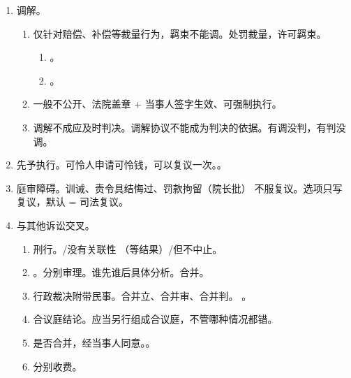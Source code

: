 \begin{enumerate}
\begin{enumerate}
        \end{enumerate}
  \item 调解。
        \begin{enumerate}
          \item 仅针对赔偿、补偿等裁量行为，羁束不能调。处罚裁量，许可羁束。
                \begin{enumerate}
                  \item {}。
                  \item {}。
                \end{enumerate}
          \item 一般不公开、法院盖章 + 当事人签字生效、可强制执行。
          \item 调解不成应及时判决。调解协议不能成为判决的依据。有调没判，有判没调。
        \end{enumerate}
  \item 先予执行。可怜人申请可怜钱，可以复议一次。。
  \item 庭审障碍。训诫、责令具结悔过、罚款拘留（院长批） \yjt 不服复议。选项只写复议，默认 = 司法复议。
  \item 与其他诉讼交叉。
        \begin{enumerate}
          \item 刑行。/没有关联性 \yjt {}（等结果）/但不中止。
          \item {}。\yi 分别审理。谁先谁后具体分析。\er 合并。
          \item 行政裁决附带民事。合并立、合并审、合并判。
                。
          \item 合议庭结论。应当另行组成合议庭，不管哪种情况都错。
          \item 是否合并，经当事人同意。。
          \item 分别收费。
        \end{enumerate}
\end{enumerate}
